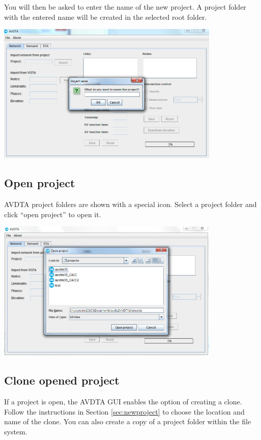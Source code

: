 You will then be asked to enter the name of the new project. A project folder with the entered name will be created in the selected root folder.


\begin{center}
\includegraphics[width=0.8\textwidth]{images/project3.png}
\end{center}

\subsection{Open project}

AVDTA project folders are shown with a special icon. Select a project folder and click ``open project'' to open it.

\begin{center}
\includegraphics[width=0.8\textwidth]{images/project4.png}
\end{center}

\subsection{Clone opened project}

If a project is open, the AVDTA GUI enables the option of creating a clone. Follow the instructions in Section \ref{sec:newproject} to choose the location and name of the clone. You can also create a copy of a project folder within the file system.

